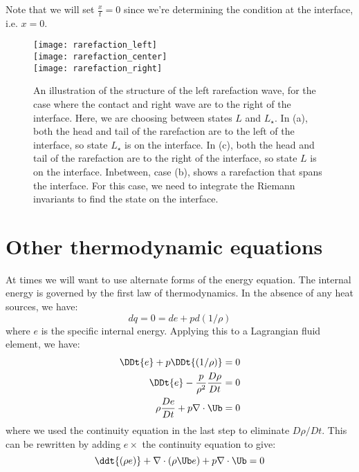Note that we will set $\frac{x}{t} = 0$ since we're determining the condition at the interface, i.e. $x=0$.


\begin{figure}
\centering
\texttt{[image: rarefaction\_left]} \\
\texttt{[image: rarefaction\_center]} \\
\texttt{[image: rarefaction\_right]}
\caption[Rarefaction configuration for the Riemann problem]
        {\label{fig:euler:rarefaction_sample} An illustration of the
          structure of the left rarefaction wave, for the case
          where the contact and right wave are to the right of the
          interface.  Here, we are choosing between states $L$ and $L_\star$.
          In (a), both the head and tail of the rarefaction are to the
          left of the interface, so state $L_\star$ is on the interface.
          In (c), both the head and tail of the rarefaction are to the
          right of the interface, so state $L$ is on the interface.
          Inbetween, case (b), shows a rarefaction that spans the
          interface.  For this case, we need to integrate the Riemann
          invariants to find the state on the interface.}
\end{figure}


\section{Other thermodynamic equations}

\label{sec:euler:otherthermo}

At times we will want to use alternate forms of the energy equation.  The
internal energy is governed by the first law of thermodynamics.  In the
absence of any heat sources, we have:
\begin{equation}
dq = 0 = de + pd(1/\rho)
\end{equation}
where $e$ is the specific internal energy.
Applying this to a Lagrangian fluid element, we have:
\begin{align}
\DDt{e} + p \DDt{(1/\rho)} &= 0 \\
\DDt{e} - \frac{p}{\rho^2} \frac{D\rho}{Dt} &= 0 \\
\rho \frac{De}{Dt} + p \nabla \cdot \Ub &= 0
\end{align}
where we used the continuity equation in the last step to eliminate
$D\rho/Dt$.  This can be rewritten by adding $e \times$ the continuity
equation to give:
\begin{equation}
\ddt{(\rho e)} + \nabla \cdot (\rho \Ub e) + p \nabla \cdot \Ub = 0 \label{eq:euler:econs}
\end{equation}


